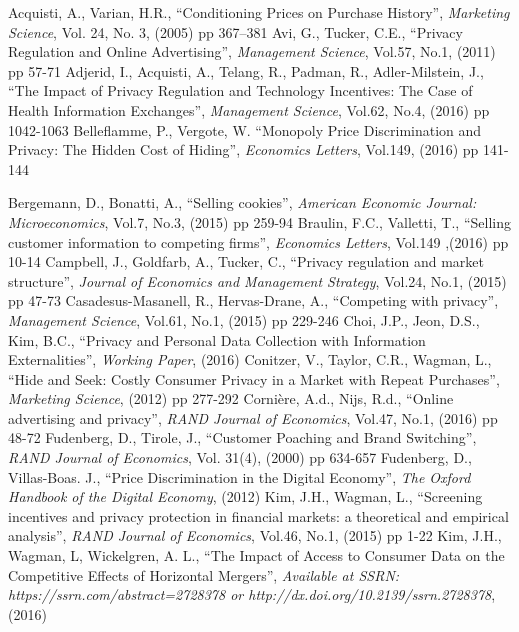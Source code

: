 \documentclass[12pt]{article}
\begin{document}
\begin{thebibliography}{99}
	 Acquisti, A., Varian, H.R., ``Conditioning Prices on Purchase History'', \textit{Marketing Science}, Vol. 24, No. 3, (2005) pp 367–381
	 Avi, G., Tucker, C.E., ``Privacy Regulation and Online Advertising'', \textit{Management Science}, Vol.57, No.1, (2011) pp 57-71
 Adjerid, I., Acquisti, A., Telang, R., Padman, R., Adler-Milstein, J., ``The Impact of Privacy Regulation and Technology Incentives: The Case of Health Information Exchanges'', \textit{Management Science}, Vol.62, No.4, (2016) pp 1042-1063 
 Belleflamme, P., Vergote, W. ``Monopoly Price Discrimination and Privacy: The Hidden Cost of Hiding'', \textit{Economics Letters}, Vol.149, (2016) pp 141-144

 Bergemann, D., Bonatti, A., ``Selling cookies'', \textit{American Economic Journal: Microeconomics}, Vol.7, No.3, (2015) pp 259-94
 Braulin, F.C., Valletti, T., ``Selling customer information to competing firms'', \textit{Economics Letters}, Vol.149 ,(2016) pp 10-14
 Campbell, J., Goldfarb, A., Tucker, C., ``Privacy regulation and market structure'', 
\textit{Journal of Economics and Management Strategy}, Vol.24, No.1, (2015) pp 47-73  
 Casadesus-Masanell, R., Hervas-Drane, A.,  ``Competing with privacy'', 
\textit{Management Science}, Vol.61, No.1, (2015) pp 229-246 
 Choi, J.P., Jeon, D.S., Kim, B.C.,  ``Privacy and Personal Data Collection with Information Externalities'', 
\textit{Working Paper}, (2016)
 Conitzer, V., Taylor, C.R., Wagman, L., ``Hide and Seek: Costly Consumer Privacy in a Market with Repeat Purchases'', \textit{Marketing Science}, (2012) pp 277-292
 Corni\`{e}re, A.d., Nijs, R.d., ``Online advertising and privacy'', 
\textit{RAND Journal of Economics}, Vol.47, No.1, (2016) pp 48-72
 Fudenberg, D., Tirole, J., ``Customer Poaching and Brand Switching'', \textit{RAND Journal of Economics}, Vol. 31(4), (2000) pp 634-657
 Fudenberg, D., Villas-Boas. J., ``Price Discrimination in the Digital Economy”, \textit{The Oxford Handbook of the Digital Economy}, (2012)
 Kim, J.H., Wagman, L., ``Screening incentives and privacy protection in financial markets: a theoretical and empirical analysis'', \textit{RAND Journal of Economics}, Vol.46, No.1, (2015) pp 1-22
 Kim, J.H., Wagman, L, Wickelgren, A. L., ``The Impact of Access to Consumer Data on the Competitive Effects of Horizontal Mergers'', \textit{Available at SSRN: https://ssrn.com/abstract=2728378 or http://dx.doi.org/10.2139/ssrn.2728378}, (2016)

\end{thebibliography}
\end{document}

